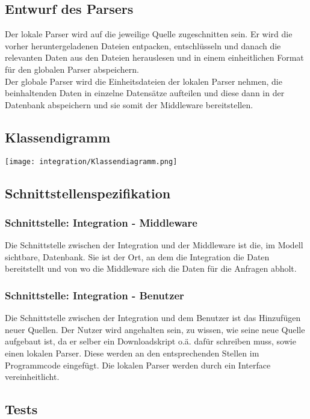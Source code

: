 \subsection{Entwurf des Parsers}
Der lokale Parser wird auf die jeweilige Quelle zugeschnitten sein. Er wird die vorher heruntergeladenen Dateien entpacken, entschlüsseln und danach die relevanten Daten aus den Dateien herauslesen und in einem einheitlichen Format für den globalen Parser abspeichern.\\
Der globale Parser wird die Einheitsdateien der lokalen Parser nehmen, die beinhaltenden Daten in einzelne Datensätze aufteilen und diese dann in der Datenbank abspeichern und sie somit der Middleware bereitstellen.
\subsection{Klassendigramm}
\texttt{[image: integration/Klassendiagramm.png]}
\subsection{Schnittstellenspezifikation}
\subsubsection{Schnittstelle: Integration - Middleware}
Die Schnittstelle zwischen der Integration und der Middleware ist die, im Modell sichtbare, Datenbank. Sie ist der Ort, an dem die Integration die Daten bereitstellt und von wo die Middleware sich die Daten für die Anfragen abholt.
\subsubsection{Schnittstelle: Integration - Benutzer}
Die Schnittstelle zwischen der Integration und dem Benutzer ist das Hinzufügen neuer Quellen. Der Nutzer wird angehalten sein, zu wissen, wie seine neue Quelle aufgebaut ist, da er selber ein Downloadskript o.ä. dafür schreiben muss, sowie einen lokalen Parser. Diese werden an den entsprechenden Stellen im Programmcode eingefügt. Die lokalen Parser werden durch ein Interface vereinheitlicht.
\subsection{Tests}
